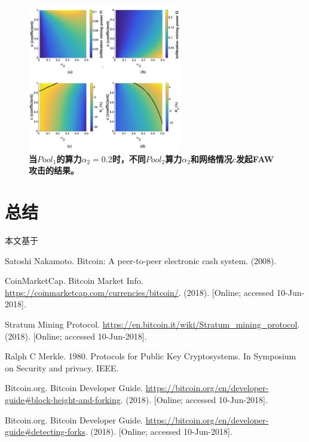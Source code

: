 \documentclass[a4paper, 11pt]{article}
\begin{document}
\begin{CJK*}{UTF8}{gbsn}
    \begin{figure}[h]
        \centering
        \includegraphics[width=0.6\textwidth]{figure6}
        \caption{\textbf{当$Pool_1$的算力$\alpha_2=0.2$时，不同$Pool_2$算力$\alpha_2$和网络情况$c$发起FAW攻击的结果。}}
        \label{figure:figure6}
    \end{figure}

    \section{总结}

    \indent

    本文基于


    \clearpage

    \begin{thebibliography}{8}

    Satoshi Nakamoto. Bitcoin: A peer-to-peer electronic cash system. (2008).

    CoinMarketCap. Bitcoin Market Info. 
    \url{https://coinmarketcap.com/currencies/bitcoin/}. 
    (2018). [Online; accessed 10-Jun-2018].


    Stratum Mining Protocol. 
    \url{https://en.bitcoin.it/wiki/Stratum_mining_protocol}.
    (2018). [Online; accessed 10-Jun-2018].
    
    
    Ralph C Merkle. 1980. Protocols for Public Key Cryptosystems. In Symposium on
    Security and privacy. IEEE.

    Bitcoin.org. Bitcoin Developer Guide. 
    \url{https://bitcoin.org/en/developer-guide#block-height-and-forking}.
    (2018). [Online; accessed 10-Jun-2018].


    Bitcoin.org. Bitcoin Developer Guide. 
    \url{https://bitcoin.org/en/developer-guide#detecting-forks}.
    (2018). [Online; accessed 10-Jun-2018].


\end{thebibliography}
\end{CJK*}
\end{document}
